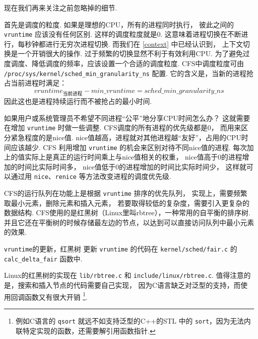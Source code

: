 现在我们再来关注之前忽略掉的细节.

首先是调度的粒度.
如果是理想的CPU，所有的进程同时执行，
彼此之间的 \lstinline{vruntime} 应该没有任何区别.
这样的调度粒度就是0.
这意味着进程切换在不断进行，每秒钟都进行无穷次进程切换.
而我们在 \ref{context} 中已经认识到，
上下文切换是一个开销很大的操作.
过于频繁的切换显然不利于有效利用CPU.
为了避免过度调度、降低调度的频率，应该设置一个合适的调度粒度.\cite{CFSSched96:online}
CFS中调度粒度可由 \lstinline{/proc/sys/kernel/sched_min_granularity_ns} 配置.
它的含义是，当新的进程抢占当前进程时满足：
\begin{equation*}
	vruntime_{\mbox{当前进程}}-min\_vruntime = sched\_min\_granularity\_ns
\end{equation*}
因此这也是进程持续运行而不被抢占的最小时间.

如果用户或系统管理员不希望不同进程“公平”地分享CPU时间怎么办？
这就需要在增加 \lstinline{vruntime} 时做一些调整.
CFS调度的所有进程的优先级都是0，
而用来区分紧急程度的是nice值.
nice值越高，进程就对其他进程越“友好”，占用的CPU时间应该越少.
CFS 利用增加 \lstinline{vruntime} 的机会来区别对待不同nice值的进程.
每次加上的值实际上是真正的运行时间乘上与nice值相关的权重，
nice值高于0的进程增加的时间比实际时间多，
nice值低于0的进程增加的时间比实际时间少，
这样就可以通过用 \lstinline{nice}、\lstinline{renice} 等方法改变进程的调度优先级.

CFS的运行队列在功能上是根据 \lstinline{vruntime} 排序的优先队列，
实现上，需要频繁取最小元素，删除元素和插入元素，
若要取得较低的复杂度，需要引入更复杂的数据结构.
CFS使用的是红黑树（Linux里叫rbtree），一种常用的自平衡的排序树.
并且它还在平衡树的时候存储最左边的节点，以达到可以直接访问队列中最小元素的效果.

\begin{readsrcbox}{\lstinline{vruntime}的更新，红黑树}
	更新 \lstinline{vruntime} 的代码在 \lstinline{kernel/sched/fair.c} 的
	\lstinline{calc_delta_fair} 函数中.

	Linux的红黑树的实现在 \lstinline{lib/rbtree.c} 和
	\lstinline{include/linux/rbtree.c}.
	值得注意的是，搜索和插入节点的代码需要自己实现，
	因为C语言缺乏对泛型的支持，而使用回调函数又有很大开销%
	\footnote{
		例如C语言的 \lstinline{qsort} 就远不如支持泛型的C++的STL 中的
		\lstinline{sort}，因为无法内联特定实现的函数，还需要解引用函数指针.}.
\end{readsrcbox}

